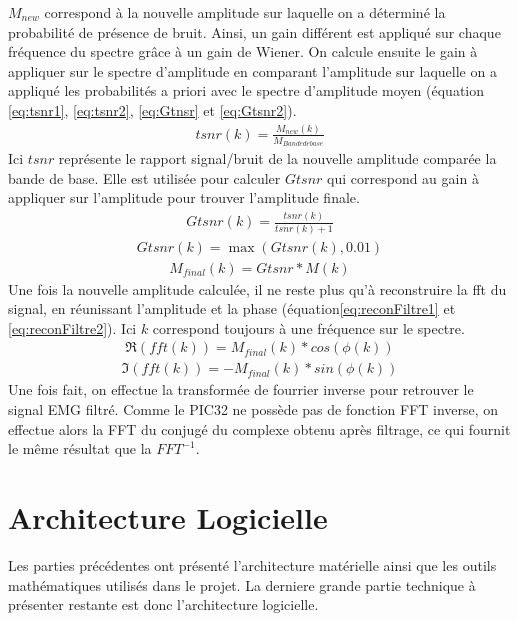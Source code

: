 \documentclass[letterpaper, twoside, 12pt, memoire, creativecommons, hyperref]{thETS}
\begin{document}
$M_{new}$ correspond à la nouvelle amplitude sur laquelle on a déterminé la probabilité de présence de bruit. Ainsi, un gain différent est appliqué sur chaque fréquence du spectre grâce à un gain de Wiener. On calcule ensuite le gain à appliquer sur le spectre d'amplitude en comparant l'amplitude sur laquelle on a appliqué les probabilités a priori avec le spectre d'amplitude moyen (équation \ref{eq:tsnr1}, \ref{eq:tsnr2}, \ref{eq:Gtnsr} et \ref{eq:Gtsnr2}).
\begin{align}\label{eq:tsnr1}
   tsnr(k) = \frac{M_{new}(k)}{M_{Bande de base}}
\end{align}
Ici $tsnr$ représente le rapport signal/bruit de la nouvelle amplitude comparée la bande de base. Elle est utilisée pour calculer $Gtsnr$ qui correspond au gain à appliquer sur l'amplitude pour trouver l'amplitude finale.
\begin{align}\label{eq:tsnr2}
   Gtsnr(k) = \frac{tsnr(k)}{tsnr(k)+1}
\end{align}
\begin{align}\label{eq:Gtnsr}
   Gtsnr(k) = \max(Gtsnr(k), 0.01)
\end{align}
\begin{align}\label{eq:Gtsnr2}
   M_{final}(k) = Gtsnr * M(k)
\end{align}
Une fois la nouvelle amplitude calculée, il ne reste plus qu'à reconstruire la fft du signal, en réunissant l'amplitude et la phase (équation\ref{eq:reconFiltre1} et \ref{eq:reconFiltre2}). Ici $k$ correspond toujours à une fréquence sur le spectre.
\begin{align}\label{eq:reconFiltre1}
   \Re(fft(k)) = M_{final}(k) * cos(\phi(k))
\end{align}
\begin{align}\label{eq:reconFiltre2}
   \Im(fft(k)) = -M_{final}(k) * sin(\phi(k))
\end{align}
Une fois fait, on effectue la transformée de fourrier inverse pour retrouver le signal EMG filtré. Comme le PIC32 ne possède pas de fonction FFT inverse, on effectue alors la FFT du conjugé du complexe obtenu après filtrage, ce qui fournit le même résultat que la $FFT^{-1}$.

\section{Architecture Logicielle}

Les parties précédentes ont présenté l'architecture matérielle ainsi que les outils mathématiques utilisés dans le projet. La derniere grande partie technique à présenter restante est donc l'architecture logicielle. 
\end{document}
